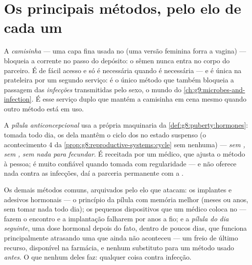 \section{Os principais métodos, pelo elo de cada um}

\begin{definition}\label{def:g8:contraception:condom}
A \emph{camisinha} --- uma capa fina usada no 
(uma versão feminina forra a vagina) --- bloqueia a corrente no passo
do depósito: o sêmen nunca entra no corpo do parceiro. É de fácil
acesso e só é necessária quando é necessária --- e é única na
prateleira por um segundo serviço: é o único método que também bloqueia
a passagem das \emph{infecções} transmitidas pelo sexo, o mundo do
\cref{ch:g9:microbes-and-infection}. É esse serviço duplo que mantém a
camisinha em cena mesmo quando outro método está em uso.
\end{definition}

\begin{definition}\label{def:g8:contraception:pill}
A \emph{pílula anticoncepcional} usa a
própria maquinaria da \cref{def:g8:puberty:hormones}: tomada todo dia,
os  dela mantêm o ciclo dos  no estado suspenso (o
acontecimento 4 da \cref{prop:g8:reproductive-systems:cycle} sem
 nenhuma) --- \emph{sem , sem , sem nada para fecundar}. É receitada por um médico, que
ajusta o método à pessoa; é muito confiável quando tomada com
regularidade --- e não oferece nada contra as infecções, daí a parceria
permanente com a .
\end{definition}

\begin{example}\label{ex:g8:contraception:shelf}
Os demais métodos comuns, arquivados pelo elo que atacam: os implantes
e adesivos hormonais --- o princípio da pílula com memória melhor
(meses ou anos, sem tomar nada todo dia); os pequenos dispositivos que
um médico coloca no  --- fazem o encontro e a implantação falharem
por anos a fio; e a \emph{pílula do dia seguinte}, uma dose hormonal
depois do fato, dentro de poucos dias, que funciona principalmente
atrasando uma  que ainda não aconteceu --- um freio de último
recurso, disponível na farmácia, e nenhum substituto para um método
usado \emph{antes}. O que nenhum deles faz: qualquer coisa contra
infecção.
\end{example}

